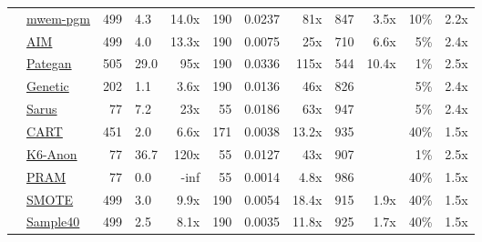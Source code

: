 \begin{table}
\begin{tabular}{llrlr@{\hskip 10pt}r@{\hskip 6pt}l@{\hskip 6pt}r@{\hskip 10pt}r@{\hskip 6pt}r@{\hskip 6pt}r@{\hskip 6pt}r}
        \cellcolor{ForestGreen} & \href{https://htmlpreview.github.io/?https://github.com/yoid2000/sdnist-summary/blob/main/results/mwem_pgm/report.html}{mwem-pgm} & 499 & 4.3 & 14.0x & 190 & 0.0237 & 81x & 847 & 3.5x & 10\% & 2.2x \\
        \cellcolor{ForestGreen} & \href{https://htmlpreview.github.io/?https://github.com/yoid2000/sdnist-summary/blob/main/results/aim_e_10_all/report.html}{AIM} & 499 & 4.0 & 13.3x & 190 & 0.0075 & 25x & 710 & 6.6x & 5\% & 2.4x \\
        \cellcolor{ForestGreen} & \href{https://htmlpreview.github.io/?https://github.com/yoid2000/sdnist-summary/blob/main/results/pategan_n_iter_50_e_10_all/report.html}{Pategan} & 505 & 29.0 & 95x & 190 & 0.0336 & 115x & 544 & 10.4x & 1\% & 2.5x \\
        \cellcolor{YellowGreen} & \href{https://htmlpreview.github.io/?https://github.com/yoid2000/sdnist-summary/blob/main/results/genetic_sd_e_10_simple/report.html}{Genetic} & 202 & 1.1 & 3.6x & 190 & 0.0136 & 46x & 826 &   & 5\% & 2.4x \\
        \cellcolor{YellowGreen} & \href{https://htmlpreview.github.io/?https://github.com/yoid2000/sdnist-summary/blob/main/results/sarus_sdg_demographic/report.html}{Sarus} & 77 & 7.2 & 23x & 55 & 0.0186 & 63x & 947 &   & 5\% & 2.4x \\
        \cellcolor{SkyBlue} & \href{https://htmlpreview.github.io/?https://github.com/yoid2000/sdnist-summary/blob/main/results/cart_cf21/report.html}{CART} & 451 & 2.0 & 6.6x & 171 & 0.0038 & 13.2x & 935 &   & 40\% & 1.5x \\
        \cellcolor{Salmon} & \href{https://htmlpreview.github.io/?https://github.com/yoid2000/sdnist-summary/blob/main/results/k_anonymity_k_6/report.html}{K6-Anon} & 77 & 36.7 & 120x & 55 & 0.0127 & 43x & 907 &   & 1\% & 2.5x \\
        \cellcolor{Goldenrod} & \href{https://htmlpreview.github.io/?https://github.com/yoid2000/sdnist-summary/blob/main/results/pram_default/report.html}{PRAM} & 77 & 0.0 & -inf & 55 & 0.0014 & 4.8x & 986 &   & 40\% & 1.5x \\
        \cellcolor{Tan} & \href{https://htmlpreview.github.io/?https://github.com/yoid2000/sdnist-summary/blob/main/results/smote_target_marital/report.html}{SMOTE} & 499 & 3.0 & 9.9x & 190 & 0.0054 & 18.4x & 915 & 1.9x & 40\% & 1.5x \\
        \cellcolor{Sepia} & \href{https://htmlpreview.github.io/?https://github.com/yoid2000/sdnist-summary/blob/main/results/subsample_40pcnt_all/report.html}{Sample40} & 499 & 2.5 & 8.1x & 190 & 0.0035 & 11.8x & 925 & 1.7x & 40\% & 1.5x \\
        \bottomrule
    \end{tabular}
\end{table}
